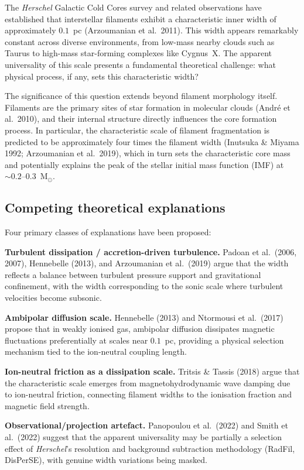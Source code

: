 \documentclass{mnras}
\begin{document}
The \textit{Herschel} Galactic Cold Cores survey and related observations have established that interstellar filaments exhibit a characteristic inner width of approximately $0.1$~pc (Arzoumanian et al.~2011). This width appears remarkably constant across diverse environments, from low-mass nearby clouds such as Taurus to high-mass star-forming complexes like Cygnus~X. The apparent universality of this scale presents a fundamental theoretical challenge: what physical process, if any, sets this characteristic width?

The significance of this question extends beyond filament morphology itself. Filaments are the primary sites of star formation in molecular clouds (Andr\'e et al.~2010), and their internal structure directly influences the core formation process. In particular, the characteristic scale of filament fragmentation is predicted to be approximately four times the filament width (Inutsuka \& Miyama 1992; Arzoumanian et al.~2019), which in turn sets the characteristic core mass and potentially explains the peak of the stellar initial mass function (IMF) at $\sim0.2$--$0.3$~M$_\odot$.

\subsection{Competing theoretical explanations}

Four primary classes of explanations have been proposed:

\textbf{Turbulent dissipation / accretion-driven turbulence.} Padoan et al.~(2006, 2007), Hennebelle (2013), and Arzoumanian et al.~(2019) argue that the width reflects a balance between turbulent pressure support and gravitational confinement, with the width corresponding to the sonic scale where turbulent velocities become subsonic.

\textbf{Ambipolar diffusion scale.} Hennebelle (2013) and Ntormousi et al.~(2017) propose that in weakly ionised gas, ambipolar diffusion dissipates magnetic fluctuations preferentially at scales near $0.1$~pc, providing a physical selection mechanism tied to the ion-neutral coupling length.

\textbf{Ion-neutral friction as a dissipation scale.} Tritsis \& Tassis (2018) argue that the characteristic scale emerges from magnetohydrodynamic wave damping due to ion-neutral friction, connecting filament widths to the ionisation fraction and magnetic field strength.

\textbf{Observational/projection artefact.} Panopoulou et al.~(2022) and Smith et al.~(2022) suggest that the apparent universality may be partially a selection effect of \textit{Herschel}'s resolution and background subtraction methodology (RadFil, DisPerSE), with genuine width variations being masked.
\end{document}
